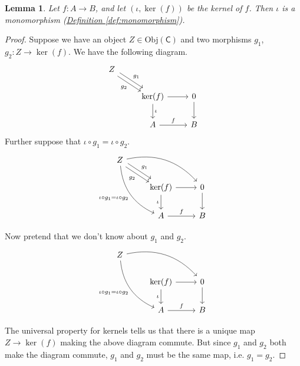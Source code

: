 \documentclass[a4paper]{report}
\newcommand{\Obj}{\mathrm{Obj}}
\theoremstyle{definition}
\theoremstyle{plain}
\newtheorem{lemma}{Lemma}[section]
\theoremstyle{remark}
\begin{document}
\begin{lemma}
  \label{lemma:canonicalinjectionismono}
  Let $f\colon A \to B$, and let $(\iota, \ker(f))$ be the kernel of $f$. Then $\iota$ is a monomorphism (\hyperref[def:monomorphism]{Definition \ref*{def:monomorphism}}).
\end{lemma}
\begin{proof}
  Suppose we have an object $Z \in \Obj(\mathsf{C})$ and two morphisms $g_{1}$, $g_{2}\colon Z \to \ker(f)$. We have the following diagram.
  \begin{equation*}
    \begin{tikzcd}
      Z
      \arrow[rd, shift left, "g_{1}"]
      \arrow[rd, shift right, swap, "g_{2}"]
      \\
      & \ker(f)
      \arrow[r]
      \arrow[d, "\iota"]
      & 0
      \arrow[d]
      \\
      & A
      \arrow[r, "f"]
      & B
    \end{tikzcd}
  \end{equation*}
  Further suppose that $\iota \circ g_{1} = \iota \circ g_{2}$.
  \begin{equation*}
    \begin{tikzcd}
      Z
      \arrow[rd, shift left, "g_{1}"]
      \arrow[rd, shift right, swap, "g_{2}"]
      \arrow[rrd, bend left]
      \arrow[rdd, bend right, swap, "\iota \circ g_{1} = \iota \circ g_{2}"]
      \\
      & \ker(f)
      \arrow[r]
      \arrow[d, swap, "\iota"]
      & 0
      \arrow[d]
      \\
      & A
      \arrow[r, "f"]
      & B
    \end{tikzcd}
  \end{equation*}

  Now pretend that we don't know about $g_{1}$ and $g_{2}$.
  \begin{equation*}
    \begin{tikzcd}
      Z
      \arrow[rrd, bend left]
      \arrow[rdd, bend right, swap, "\iota \circ g_{1} = \iota \circ g_{2}"]
      \\
      & \ker(f)
      \arrow[r]
      \arrow[d, swap, "\iota"]
      & 0
      \arrow[d]
      \\
      & A
      \arrow[r, "f"]
      & B
    \end{tikzcd}
  \end{equation*}

  The universal property for kernels tells us that there is a unique map $Z \to \ker(f)$ making the above diagram commute. But since $g_{1}$ and $g_{2}$ both make the diagram commute, $g_{1}$ and $g_{2}$ must be the same map, i.e. $g_{1} = g_{2}$.
\end{proof}
\end{document}
